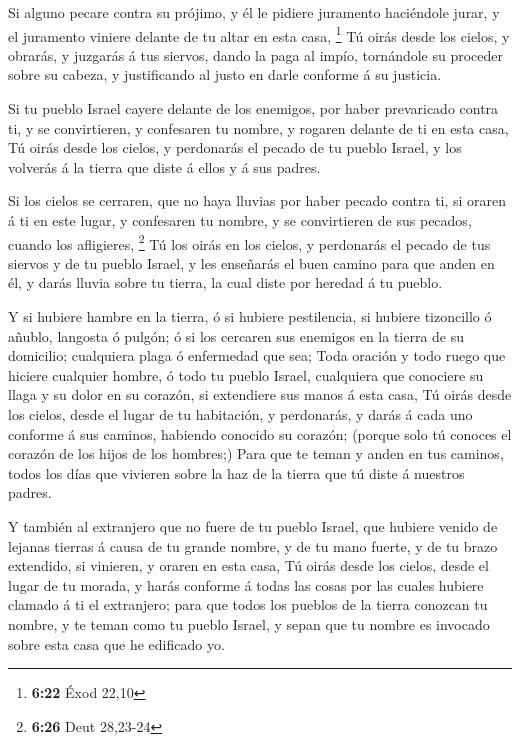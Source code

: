  Si alguno pecare contra su prójimo, y él le pidiere
juramento haciéndole jurar, y el juramento viniere delante de tu altar
en esta casa, \footnote{\textbf{6:22} Éxod 22,10}  Tú oirás
desde los cielos, y obrarás, y juzgarás á tus siervos, dando la paga al
impío, tornándole su proceder sobre su cabeza, y justificando al justo
en darle conforme á su justicia.

 Si tu pueblo Israel cayere delante de los enemigos, por
haber prevaricado contra ti, y se convirtieren, y confesaren tu nombre,
y rogaren delante de ti en esta casa,  Tú oirás desde los
cielos, y perdonarás el pecado de tu pueblo Israel, y los volverás á la
tierra que diste á ellos y á sus padres.

 Si los cielos se cerraren, que no haya lluvias por haber
pecado contra ti, si oraren á ti en este lugar, y confesaren tu nombre,
y se convirtieren de sus pecados, cuando los afligieres, \footnote{\textbf{6:26}
  Deut 28,23-24}  Tú los oirás en los cielos, y perdonarás
el pecado de tus siervos y de tu pueblo Israel, y les enseñarás el buen
camino para que anden en él, y darás lluvia sobre tu tierra, la cual
diste por heredad á tu pueblo.

 Y si hubiere hambre en la tierra, ó si hubiere
pestilencia, si hubiere tizoncillo ó añublo, langosta ó pulgón; ó si los
cercaren sus enemigos en la tierra de su domicilio; cualquiera plaga ó
enfermedad que sea;  Toda oración y todo ruego que hiciere
cualquier hombre, ó todo tu pueblo Israel, cualquiera que conociere su
llaga y su dolor en su corazón, si extendiere sus manos á esta casa,
 Tú oirás desde los cielos, desde el lugar de tu
habitación, y perdonarás, y darás á cada uno conforme á sus caminos,
habiendo conocido su corazón; (porque solo tú conoces el corazón de los
hijos de los hombres;)  Para que te teman y anden en tus
caminos, todos los días que vivieren sobre la haz de la tierra que tú
diste á nuestros padres.

 Y también al extranjero que no fuere de tu pueblo Israel,
que hubiere venido de lejanas tierras á causa de tu grande nombre, y de
tu mano fuerte, y de tu brazo extendido, si vinieren, y oraren en esta
casa,  Tú oirás desde los cielos, desde el lugar de tu
morada, y harás conforme á todas las cosas por las cuales hubiere
clamado á ti el extranjero; para que todos los pueblos de la tierra
conozcan tu nombre, y te teman como tu pueblo Israel, y sepan que tu
nombre es invocado sobre esta casa que he edificado yo.

